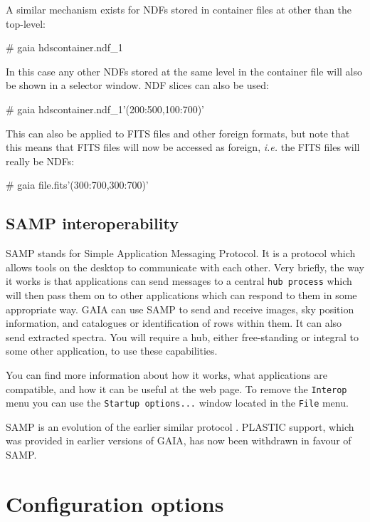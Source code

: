 \documentclass[twoside,11pt,nolof]{starlink}
\providecommand{\mytt}[1]{{\texttt{#1}}}
\begin{document}
A similar mechanism exists for NDFs stored in container files at other
than the top-level:
\begin{terminalv}
# gaia hdscontainer.ndf_1
\end{terminalv}
In this case any other NDFs stored at the same level in the container
file will also be shown in a selector window. NDF slices can also be
used:
\begin{terminalv}
# gaia hdscontainer.ndf_1'(200:500,100:700)'
\end{terminalv}
This can also be applied to FITS files and other foreign formats, but
note that this means that FITS files will now be accessed as foreign,
\textit{i.e.} the FITS files will really be NDFs:
\begin{terminalv}
# gaia file.fits'(300:700,300:700)'
\end{terminalv}

\subsection{SAMP interoperability}

SAMP stands for Simple Application Messaging Protocol. It is
a protocol which allows tools on the desktop to communicate with each other.
Very briefly, the way it works is that applications can send messages to a
central \mytt{hub process} which will then pass them on to other applications
which can respond to them in some appropriate way.
GAIA can use SAMP to send and receive images, sky position information,
and catalogues or identification of rows within them.  It can also
send extracted spectra.  You will require a hub, either free-standing or
integral to some other application, to use these capabilities.

You can find more information about how it works, what applications
are compatible, and how it can be useful at the
 web page.
To remove the \mytt{Interop} menu you can use the
\mytt{Startup options...} window located in the \mytt{File} menu.

SAMP is an evolution of the earlier similar protocol
.
PLASTIC support, which was provided in earlier versions of GAIA,
has now been withdrawn in favour of SAMP.

\section{\label{configuration_options}Configuration options}
\end{document}
